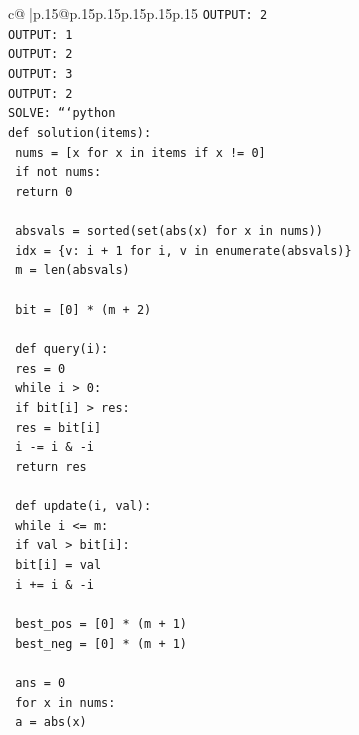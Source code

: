 \documentclass{article}
\begin{document}
{\begin{supertabular}{c@{$\;$}|p{.15\linewidth}@{}p{.15\linewidth}p{.15\linewidth}p{.15\linewidth}p{.15\linewidth}p{.15\linewidth}}
{{{\texttt{OUTPUT: 2} \\
\texttt{OUTPUT: 1} \\
\texttt{OUTPUT: 2} \\
\texttt{OUTPUT: 3} \\
\texttt{OUTPUT: 2} \\
\texttt{SOLVE: ```python} \\
\texttt{def solution(items):} \\
\texttt{    nums = {[}x for x in items if x != 0{]}} \\
\texttt{    if not nums:} \\
\texttt{        return 0} \\
\\ 
\texttt{    absvals = sorted(set(abs(x) for x in nums))} \\
\texttt{    idx = \{v: i + 1 for i, v in enumerate(absvals)\}} \\
\texttt{    m = len(absvals)} \\
\\ 
\texttt{    bit = {[}0{]} * (m + 2)} \\
\\ 
\texttt{    def query(i):} \\
\texttt{        res = 0} \\
\texttt{        while i > 0:} \\
\texttt{            if bit{[}i{]} > res:} \\
\texttt{                res = bit{[}i{]}} \\
\texttt{            i {-}= i \& {-}i} \\
\texttt{        return res} \\
\\ 
\texttt{    def update(i, val):} \\
\texttt{        while i <= m:} \\
\texttt{            if val > bit{[}i{]}:} \\
\texttt{                bit{[}i{]} = val} \\
\texttt{            i += i \& {-}i} \\
\\ 
\texttt{    best\_pos = {[}0{]} * (m + 1)} \\
\texttt{    best\_neg = {[}0{]} * (m + 1)} \\
\\ 
\texttt{    ans = 0} \\
\texttt{    for x in nums:} \\
\texttt{        a = abs(x)} \\
}}}
\end{supertabular}}
\end{document}
